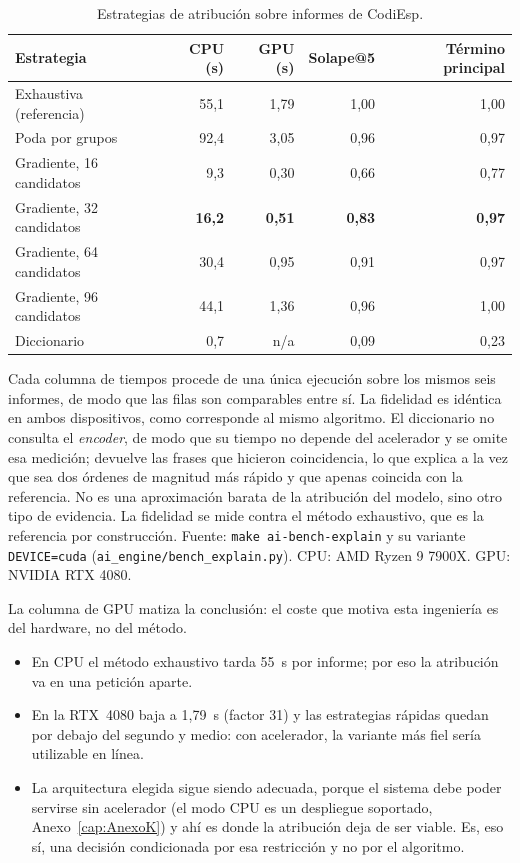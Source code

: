 \begin{table}[ht]
\centering
\small
\caption[Estrategias de atribución sobre informes de CodiEsp]{Estrategias de atribución sobre informes de CodiEsp.}
\label{tab:explicabilidad}
\begin{tabular}{lrrrr}
\hline
\textbf{Estrategia} & \textbf{CPU (s)} & \textbf{GPU (s)} & \textbf{Solape@5} & \textbf{Término principal} \\
\hline
Exhaustiva (referencia) & 55{,}1 & 1{,}79 & 1{,}00 & 1{,}00 \\
Poda por grupos & 92{,}4 & 3{,}05 & 0{,}96 & 0{,}97 \\
\hline
Gradiente, 16 candidatos & 9{,}3 & 0{,}30 & 0{,}66 & 0{,}77 \\
Gradiente, 32 candidatos & \textbf{16{,}2} & \textbf{0{,}51} & \textbf{0{,}83} & \textbf{0{,}97} \\
Gradiente, 64 candidatos & 30{,}4 & 0{,}95 & 0{,}91 & 0{,}97 \\
Gradiente, 96 candidatos & 44{,}1 & 1{,}36 & 0{,}96 & 1{,}00 \\
\hline
Diccionario & 0{,}7 & n/a & 0{,}09 & 0{,}23 \\
\hline
\end{tabular}

\vspace{2mm}
{\footnotesize Cada columna de tiempos procede de una única ejecución sobre los mismos seis informes, de modo que las filas son comparables entre sí. La fidelidad es idéntica en ambos dispositivos, como corresponde al mismo algoritmo. El diccionario no consulta el \emph{encoder}, de modo que su tiempo no depende del acelerador y se omite esa medición; devuelve las frases que hicieron coincidencia, lo que explica a la vez que sea dos órdenes de magnitud más rápido y que apenas coincida con la referencia. No es una aproximación barata de la atribución del modelo, sino otro tipo de evidencia.}
\vspace{1mm}
{\footnotesize La fidelidad se mide contra el método exhaustivo, que es la referencia por construcción. Fuente: \texttt{make ai-bench-explain} y su variante \texttt{DEVICE=cuda} (\texttt{ai\_engine/bench\_explain.py}). CPU: AMD Ryzen 9 7900X. GPU: NVIDIA RTX 4080.}
\end{table}

La columna de GPU matiza la conclusión: el coste que motiva esta ingeniería es del hardware, no del método.

\begin{itemize}
 \item En CPU el método exhaustivo tarda 55~s por informe; por eso la atribución va en una petición aparte.
 \item En la RTX~4080 baja a 1,79~s (factor 31) y las estrategias rápidas quedan por debajo del segundo y medio: con acelerador, la variante más fiel sería utilizable en línea.
 \item La arquitectura elegida sigue siendo adecuada, porque el sistema debe poder servirse sin acelerador (el modo CPU es un despliegue soportado, Anexo~\ref{cap:AnexoK}) y ahí es donde la atribución deja de ser viable. Es, eso sí, una decisión condicionada por esa restricción y no por el algoritmo.
\end{itemize}

